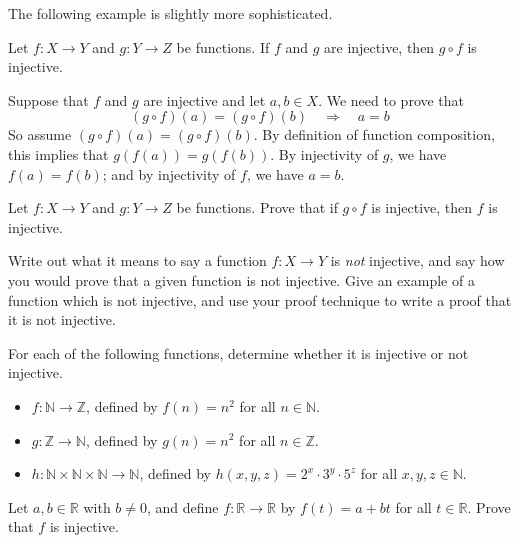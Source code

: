 The following example is slightly more sophisticated.

\begin{proposition}
\label{propCompositeOfInjectionsIsInjection}
Let $f : X \to Y$ and $g : Y \to Z$ be functions. If $f$ and $g$ are injective, then $g \circ f$ is injective.
\end{proposition}
\begin{cproof}
Suppose that $f$ and $g$ are injective and
let $a,b \in X$.
We need to prove that
\[ (g \circ f)(a) = (g \circ f)(b) \quad \Rightarrow \quad a=b \]
So assume $(g \circ f)(a) = (g \circ f)(b)$. By definition of function composition, this implies that $g(f(a))=g(f(b))$. By injectivity of $g$, we have $f(a)=f(b)$; and by injectivity of $f$, we have $a=b$.
\end{cproof}

\begin{exercise}
Let $f : X \to Y$ and $g : Y \to Z$ be functions. Prove that if $g \circ f$ is injective, then $f$ is injective.
\end{exercise}

\begin{exercise}
Write out what it means to say a function $f : X \to Y$ is \textit{not} injective, and say how you would prove that a given function is not injective. Give an example of a function which is not injective, and use your proof technique to write a proof that it is not injective.
\end{exercise}

\begin{exercise}
For each of the following functions, determine whether it is injective or not injective.
\begin{itemize} 
\item $f : \mathbb{N} \to \mathbb{Z}$, defined by $f(n)=n^2$ for all $n \in \mathbb{N}$.
\item $g : \mathbb{Z} \to \mathbb{N}$, defined by $g(n)=n^2$ for all $n \in \mathbb{Z}$.
\item $h : \mathbb{N} \times \mathbb{N} \times \mathbb{N} \to \mathbb{N}$, defined by $h(x,y,z) = 2^x \cdot 3^y \cdot 5^z$ for all $x,y,z \in \mathbb{N}$.
\end{itemize}
\end{exercise}

\begin{exercise}
\label{exLinearPolynomialIsInjective}
Let $a,b \in \mathbb{R}$ with $b \ne 0$, and define $f : \mathbb{R} \to \mathbb{R}$ by $f(t) = a+bt$ for all $t \in \mathbb{R}$. Prove that $f$ is injective.
\end{exercise}

